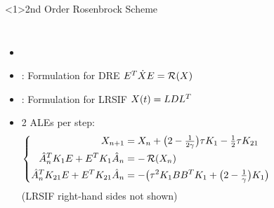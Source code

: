 \begin{frame}<1>{2nd Order Rosenbrock Scheme}
\begin{columns}
  \begin{itemize}
    \item
      \cite{Verwer1999}
    \item
      \cite{Mena2007}: Formulation for DRE $E^T \dot X E = \operatorname{\mathcal R}(X)$
    \item
      \cite{Lang2017}: Formulation for LRSIF $X(t) = LDL^T$
    \item
      2 ALEs per step:
      \begin{equation*}
      \left\{
      \begin{aligned}
        X_{n+1} &= X_n + \big( 2 - \tfrac{1}{2\gamma} \big) \tau K_1 - \tfrac{1}{2} \tau K_{21} \\
        \hat A_n^T K_1 E + E^T K_1 \hat A_n &= -\operatorname{\mathcal R}(X_n) \\
        \hat A_n^T K_{21} E + E^T K_{21} \hat A_n &= -\big( \tau^2 K_1 BB^T K_1 + \big( 2-\tfrac{1}{\gamma} \big) K_1 \big)
      \end{aligned}
      \right.
      \end{equation*}
      (LRSIF right-hand sides not shown)
  \end{itemize}
\end{columns}
\end{frame}
